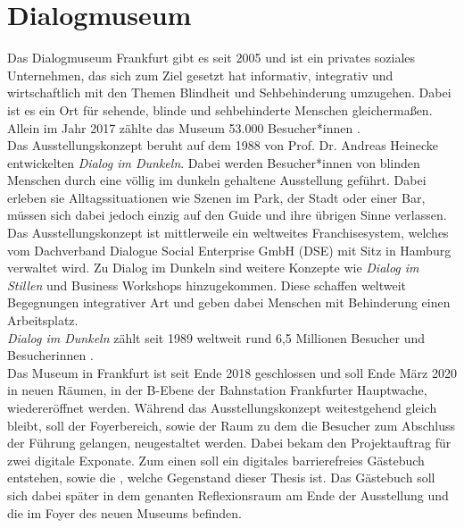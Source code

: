 \section{Dialogmuseum}
\label{sec:dialogmuseum}

Das Dialogmuseum Frankfurt \cite{dialogmuseum} gibt es seit 2005 und ist ein privates soziales 
Unternehmen, das sich zum Ziel gesetzt hat informativ, integrativ und wirtschaftlich mit 
den Themen Blindheit und Sehbehinderung umzugehen. Dabei ist es ein Ort für sehende, 
blinde und sehbehinderte Menschen gleichermaßen. Allein im Jahr 2017 zählte das Museum 53.000 
Besucher*innen \cite{besucher}.\\

Das Ausstellungskonzept beruht auf dem 1988 von Prof. Dr. Andreas Heinecke entwickelten
\emph{Dialog im Dunkeln}. Dabei werden Besucher*innen von blinden Menschen durch eine 
völlig im dunkeln gehaltene Ausstellung geführt. Dabei erleben sie Alltagssituationen
wie Szenen im Park, der Stadt oder einer Bar, müssen sich dabei jedoch einzig auf
den Guide und ihre übrigen Sinne verlassen.\\

Das Ausstellungskonzept ist mittlerweile ein weltweites Franchisesystem, welches vom 
Dachverband Dialogue Social Enterprise GmbH (DSE) \cite{dachverband} mit Sitz in Hamburg verwaltet wird.
Zu Dialog im Dunkeln sind weitere Konzepte wie \emph{Dialog im Stillen} und Business Workshops
hinzugekommen. Diese schaffen weltweit Begegnungen integrativer Art und geben dabei 
Menschen mit Behinderung einen Arbeitsplatz.\\
\emph{Dialog im Dunkeln} zählt seit 1989 weltweit rund 6,5 Millionen Besucher und Besucherinnen
\cite{weltweit}.\\

Das Museum in Frankfurt ist seit Ende 2018 geschlossen und soll Ende März 2020 in neuen Räumen, in der B-Ebene
der Bahnstation Frankfurter Hauptwache, wiedereröffnet werden. Während das Ausstellungskonzept
weitestgehend gleich bleibt, soll der Foyerbereich, sowie der Raum zu dem die Besucher zum Abschluss
der Führung gelangen, neugestaltet werden. Dabei bekam \meso{} den Projektauftrag für zwei
digitale Exponate. Zum einen soll ein digitales barrierefreies Gästebuch entstehen, sowie die
\shst{}, welche Gegenstand dieser Thesis ist. Das Gästebuch soll sich dabei später in dem 
genanten Reflexionsraum am Ende der Ausstellung und die \shst{} im Foyer des neuen Museums befinden.
